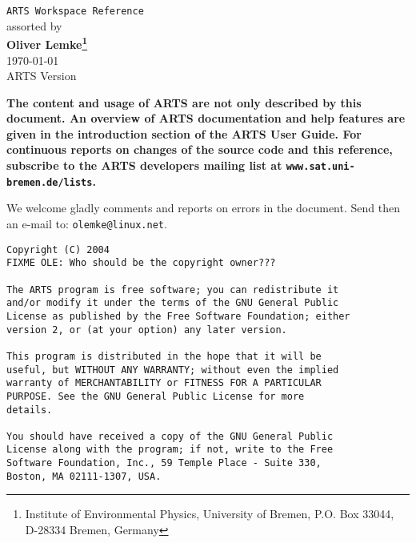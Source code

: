 





%
\renewcommand{\thepage}{title \arabic{page}} 

\thispagestyle{plain}
\begin{center}
  \vspace*{2cm}
  {\Huge \verb|ARTS Workspace Reference|\\}
  \vspace*{1cm}
  {\large assorted by \\}
  \vspace*{1cm}
  {\Large \bf Oliver Lemke\footnote{
      Institute of Environmental Physics, University of Bremen, 
      P.O. Box 33044, D-28334 Bremen, Germany}  
    }\\
   \vspace*{2cm}
   {\large \today\\
    ARTS Version 
   }
\end{center}
\vspace*{4cm}
{\normalsize \bf
  \noindent
  The content and usage of ARTS are not only described by this
  document. An overview of ARTS documentation and help features are
  given in the introduction section of the ARTS User Guide. For continuous
  reports on changes of the source code and this reference, subscribe to
  the ARTS developers mailing list at \verb|www.sat.uni-bremen.de/lists|.

  We welcome gladly comments and reports on errors in the document.
  Send then an e-mail to: \verb|olemke@linux.net|.
}

\newpage                          
\thispagestyle{empty}
\vspace*{\fill}
\noindent
\begin{verbatim}
Copyright (C) 2004
FIXME OLE: Who should be the copyright owner???

The ARTS program is free software; you can redistribute it
and/or modify it under the terms of the GNU General Public
License as published by the Free Software Foundation; either
version 2, or (at your option) any later version.

This program is distributed in the hope that it will be
useful, but WITHOUT ANY WARRANTY; without even the implied
warranty of MERCHANTABILITY or FITNESS FOR A PARTICULAR
PURPOSE. See the GNU General Public License for more
details. 

You should have received a copy of the GNU General Public
License along with the program; if not, write to the Free
Software Foundation, Inc., 59 Temple Place - Suite 330,
Boston, MA 02111-1307, USA. 
\end{verbatim}



